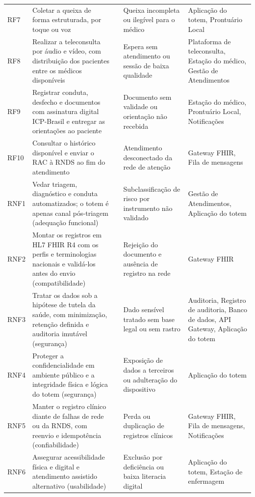 {\begin{longtable}{L{0.9cm} L{4.3cm} L{1.8cm} L{3.0cm} L{3.4cm}}
RF7 & Coletar a queixa de forma estruturada, por toque ou voz & \cite{portaria234, joseph2023} & Queixa incompleta ou ilegível para o médico & Aplicação do totem, Prontuário Local \\
RF8 & Realizar a teleconsulta por áudio e vídeo, com distribuição dos pacientes entre os médicos disponíveis & \cite{cfm2314, portaria3691} & Espera sem atendimento ou sessão de baixa qualidade & Plataforma de teleconsulta, Estação do médico, Gestão de Atendimentos \\
RF9 & Registrar conduta, desfecho e documentos com assinatura digital ICP-Brasil e entregar as orientações ao paciente & \cite{cfm2314, portaria234} & Documento sem validade ou orientação não recebida & Estação do médico, Prontuário Local, Notificações \\
RF10 & Consultar o histórico disponível e enviar o RAC à RNDS ao fim do atendimento & \cite{portaria234, portaria3691, rndsconector} & Atendimento desconectado da rede de atenção & Gateway FHIR, Fila de mensagens \\
\midrule
RNF1 & Vedar triagem, diagnóstico e conduta automatizados; o totem é apenas canal pós-triagem (adequação funcional) & \cite{dickson2022, joseph2023} & Subclassificação de risco por instrumento não validado & Gestão de Atendimentos, Aplicação do totem \\
RNF2 & Montar os registros em HL7 FHIR R4 com os perfis e terminologias nacionais e validá-los antes do envio (compatibilidade) & \cite{rndsig, portaria234, hl7fhirr4} & Rejeição do documento e ausência de registro na rede & Gateway FHIR \\
RNF3 & Tratar os dados sob a hipótese de tutela da saúde, com minimização, retenção definida e auditoria imutável (segurança) & \cite{lgpd2018, leme2020, lei13787} & Dado sensível tratado sem base legal ou sem rastro & Auditoria, Registro de auditoria, Banco de dados, API Gateway, Aplicação do totem \\
RNF4 & Proteger a confidencialidade em ambiente público e a integridade física e lógica do totem (segurança) & \cite{lei14510, lgpd2018} & Exposição de dados a terceiros ou adulteração do dispositivo & Aplicação do totem \\
RNF5 & Manter o registro clínico diante de falhas de rede ou da RNDS, com reenvio e idempotência (confiabilidade) & \cite{rndserros, rndsconector} & Perda ou duplicação de registros clínicos & Gateway FHIR, Fila de mensagens, Notificações \\
RNF6 & Assegurar acessibilidade física e digital e atendimento assistido alternativo (usabilidade) & \cite{lbi2015, nbr9050, emag, wcag21, joseph2023} & Exclusão por deficiência ou baixa literacia digital & Aplicação do totem, Estação de enfermagem \\

\end{longtable}}
